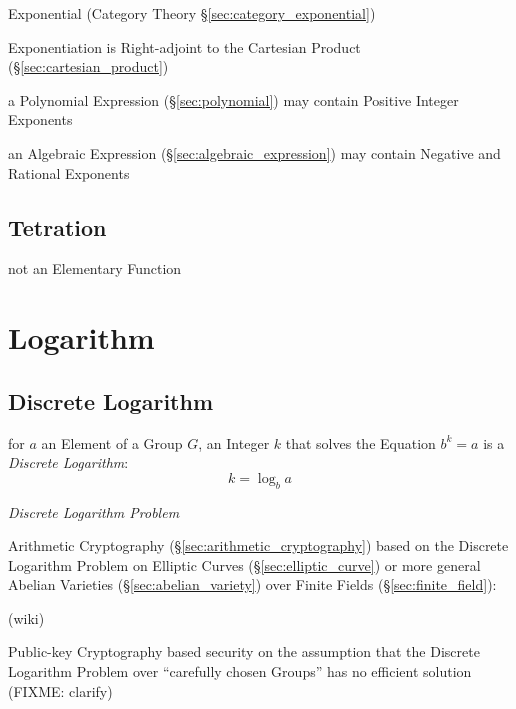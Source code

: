 \fist Exponential (Category Theory \S\ref{sec:category_exponential})

Exponentiation is Right-adjoint to the Cartesian Product
(\S\ref{sec:cartesian_product})

a Polynomial Expression (\S\ref{sec:polynomial}) may contain
Positive Integer Exponents

an Algebraic Expression (\S\ref{sec:algebraic_expression}) may contain Negative
and Rational Exponents



\subsection{Tetration}\label{sec:tetration}

not an Elementary Function



\section{Logarithm}\label{sec:logarithm}

\subsection{Discrete Logarithm}\label{sec:discrete_logarithm}

for $a$ an Element of a Group $G$, an Integer $k$ that solves the Equation $b^k
= a$ is a \emph{Discrete Logarithm}:
\[
  k = \log_b a
\]

\emph{Discrete Logarithm Problem}

\fist Arithmetic Cryptography (\S\ref{sec:arithmetic_cryptography}) based on
the Discrete Logarithm Problem on Elliptic Curves (\S\ref{sec:elliptic_curve})
or more general Abelian Varieties (\S\ref{sec:abelian_variety}) over Finite
Fields (\S\ref{sec:finite_field}):

(wiki)

Public-key Cryptography based security on the assumption that the Discrete
Logarithm Problem over ``carefully chosen Groups'' has no efficient solution
(FIXME: clarify)

